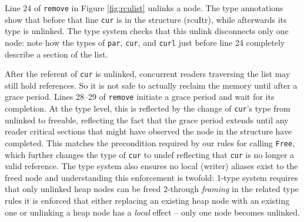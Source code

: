 Line 24 of \lstinline|remove| in Figure \ref{fig:rculist} unlinks a node.
The type annotations show that before that line \lstinline|cur| is in the structure (\textsf{rcuItr}), while afterwards its type is \textsf{unlinked}.
The type system checks that this unlink disconnects only one node: note how the types of \lstinline|par|, \lstinline|cur|, and \lstinline|curl| just before line 24 completely describe a section of the list.

After the referent of \texttt{cur} is unlinked, concurrent readers traversing the list may still hold references.  So it is not safe to actually reclaim the memory until after a grace period.
Lines 28--29 of \lstinline|remove| initiate a grace period and wait for its completion.  At the type level, this is reflected by the change of \lstinline|cur|'s type from \textsf{unlinked} to \textsf{freeable}, reflecting the fact that the grace period extends until any reader critical sections that might have observed the node in the structure have completed.
This matches the precondition required by our rules for calling \lstinline|Free|, which further changes the type of \lstinline|cur| to \textsf{undef} reflecting that \lstinline|cur| is no longer a valid reference. The type system also ensures no local (writer) aliases exist to the freed node and understanding this enforcement is twofold: 1-type system requires that only \textsf{unlinked} heap nodes can be freed 2-through \textit{framing} in the related type rules it is enforced that either replacing an existing heap node with an existing one or unlinking a heap node has a \textit{local} effect -- only one node becomes \textsf{unlinked}.

